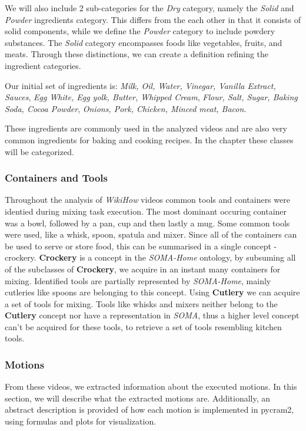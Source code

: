We will also include 2 sub-categories for the \textit{Dry} category, namely the \textit{Solid} and \textit{Powder} ingredients category. 
This differs from the each other in that it consists of solid components, while we define the \textit{Powder} category to include powdery substances. The \textit{Solid} category encompasses foods like vegetables, fruits, and meats. 
Through these distinctions, we can create a definition refining the ingredient categories.

Our initial set of ingredients is: \textit{Milk, Oil, Water, Vinegar, Vanilla Extract, Sauces}, \textit{Egg White, Egg yolk, Butter, Whipped Cream}, \textit{Flour, Salt, Sugar, Baking Soda, Cocoa Powder},
\textit{Onions, Pork, Chicken, Minced meat, Bacon}.

These ingredients are commonly used in the analyzed videos and are also very common ingredients for baking and cooking recipes.
In the chapter  these classes will be categorized.

\subsubsection{Containers and Tools}
\label{sec:ContainersAndToolsAcquisition}
Throughout the analysis of \textit{WikiHow} videos common tools and containers were identied during mixing task execution.
The most dominant occuring container was a bowl, followed by a pan, cup and then lastly a mug. Some common tools were used, like a whisk, spoon, spatula and mixer.
Since all of the containers can be used to serve or store food, this can be summarised in a single concept - crockery. \textbf{Crockery} is a concept in the \textit{SOMA-Home} \cite{soma}
ontology, by subsuming all of the subclasses of \textbf{Crockery}, we acquire in an instant many containers for mixing. Identified tools are partially represented by \textit{SOMA-Home},
mainly cutleries like spoons are belonging to this concept. Using \textbf{Cutlery} we can acquire a set of tools for mixing. Tools like whisks and mixers neither belong 
to the \textbf{Cutlery} concept nor have a representation in \textit{SOMA}, thus a higher level concept can't be acquired for these tools, to retrieve a set of tools resembling
kitchen tools.   


\subsubsection{Motions}
From these videos, we extracted information about the executed motions. In this section, we will describe what the extracted motions are. 
Additionally, an abstract description is provided of how each motion is implemented in pycram2, using formulas and plots for visualization.

